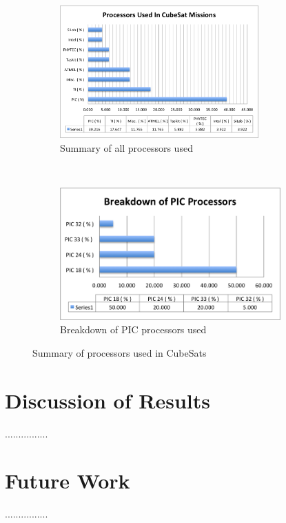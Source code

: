 \documentclass[11pt]{article}
\begin{document}
\begin{figure}[t!]
    \centering
    \begin{subfigure}[t]{0.5\textwidth}
        \centering
        \includegraphics[height=2in]{Bar_ProcessorsUsed}
        \caption{Summary of all processors used}
    \end{subfigure}%
    ~ 
    \begin{subfigure}[t]{0.5\textwidth}
        \centering
        \includegraphics[height=2in]{Bar_PICProcessors}
        \caption{Breakdown of PIC processors used}
    \end{subfigure}
    \caption{Summary of processors used in CubeSats}
		\label{processors}
\end{figure}

\section{Discussion of Results}
................
\section{Future Work}
................



\end{document}
